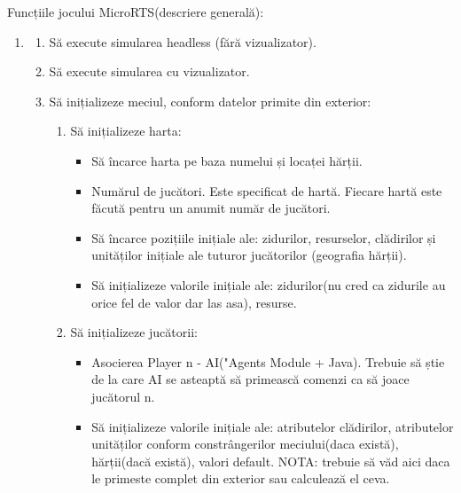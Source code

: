 \documentclass{article}
\begin{document}
Funcțiile jocului MicroRTS(descriere generală):
\begin{enumerate}
    \item \textbf{ \color{red}{Să execute simularea în timp real:} }
        \begin{enumerate}
            \item Să execute simularea headless (fără vizualizator).

            \item Să execute simularea cu vizualizator.

            \item Să inițializeze meciul, conform datelor primite din exterior:
                \begin{enumerate}
                    \item Să inițializeze harta:
                        \begin{itemize}
                            \item Să încarce harta pe baza numelui și locaței hărții.

                            \item Numărul de jucători. Este specificat de hartă. Fiecare hartă este făcută pentru un anumit număr de jucători.

                            \item Să încarce pozițiile inițiale ale: zidurilor, resurselor, clădirilor și unităților inițiale ale tuturor jucătorilor (geografia hărții).

                            \item Să inițializeze valorile inițiale ale: zidurilor(nu cred ca zidurile au orice fel de valor dar las asa), resurse.
                        \end{itemize}

                    \item Să inițializeze jucătorii:
                        \begin{itemize}
                            \item Asocierea Player n - AI("Agents Module + Java). Trebuie să știe de la care AI se asteaptă să primească comenzi ca să joace jucătorul n.

                            \item Să inițializeze valorile inițiale ale: atributelor clădirilor, atributelor unităților conform constrângerilor meciului(daca există), hărții(dacă există), valori default. NOTA: trebuie să văd aici daca le primeste complet din exterior sau calculează el ceva.
                        \end{itemize}
                \end{enumerate}



\end{enumerate}
\end{enumerate}
\end{document}
